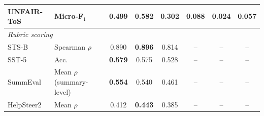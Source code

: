 \begin{tabular}{l l c c c c c c }
    \rowcolor{gray!10}UNFAIR-ToS & Micro-F$_\text{1}$ & 0.499 & \textbf{0.582} & 0.302 & 0.088 & 0.024 & 0.057 \\
    \midrule
    \multicolumn{8}{l}{\textit{Rubric scoring}} \\
    STS-B & Spearman $\rho$ & 0.890 & \textbf{0.896} & 0.814 & -- & -- & -- \\
    \rowcolor{gray!10}SST-5 & Acc. & \textbf{0.579} & 0.575 & 0.528 & -- & -- & -- \\
    SummEval & Mean $\rho$ (summary-level) & \textbf{0.554} & 0.540 & 0.461 & -- & -- & -- \\
    \rowcolor{gray!10}HelpSteer2 & Mean $\rho$ & 0.412 & \textbf{0.443} & 0.385 & -- & -- & -- \\
    \bottomrule
\end{tabular}
